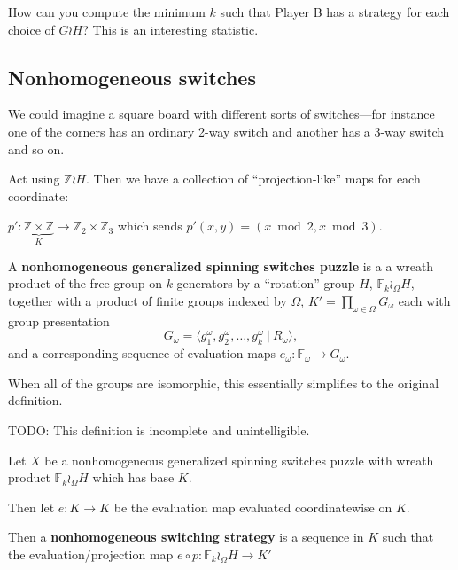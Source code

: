 How can you compute the minimum $k$ such that Player B has a strategy for each
choice of $G \wr H$? This is an interesting statistic.

\subsection{Nonhomogeneous switches}
We could imagine a square board with different sorts of switches---for instance
one of the corners has an ordinary 2-way switch and another has a 3-way switch
and so on.

\begin{example}
  Act using $\mathbb {Z} \wr H$.
  Then we have a collection of ``projection-like'' maps for each coordinate:

  $p' \colon \underbrace{\mathbb Z \times \mathbb Z}_K \rightarrow \mathbb{Z}_2 \times \mathbb{Z}_3$
  which sends $p'(x, y) = (x \bmod 2, x \bmod 3)$.
\end{example}

\begin{definition}
  A \textbf{nonhomogeneous generalized spinning switches puzzle} is a
  a wreath product of the free group on $k$ generators by a ``rotation'' group
  $H$, \(
    \mathbb F_k \wr_\Omega H
  \),
  together with a product of finite groups indexed by $\Omega$,
  $K' = \prod_{\omega \in \Omega} G_\omega$
  each with group presentation \[
    G_\omega = \langle g^\omega_1, g^\omega_2, \dots, g^\omega_k\ |\ R_\omega\rangle,
  \]
  and a corresponding sequence of evaluation maps
  $e_\omega \colon \mathbb F_\omega \rightarrow G_\omega$.
\end{definition}

When all of the groups are isomorphic, this essentially simplifies to the
original definition.

\begin{definition}
  TODO: This definition is incomplete and unintelligible.

  Let $X$ be a nonhomogeneous generalized spinning switches puzzle
  with wreath product $\mathbb F_k \wr_\Omega H$ which has base $K$.

  Then let $e\colon K \rightarrow K$ be the evaluation map evaluated
  coordinatewise on $K$.

  Then a \textbf{nonhomogeneous switching strategy} is a sequence in $K$ such
  that the evaluation/projection map
  $e \circ p \colon \mathbb F_k \wr_\Omega H \rightarrow K'$
\end{definition}

